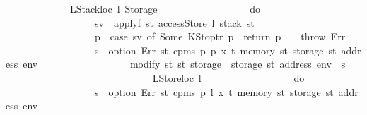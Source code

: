 \begin{isabellebody}
\ \ \ \ \ \ \ \ \ \ \ \ {\isacharbar}{\kern0pt}\ {\isacharparenleft}{\kern0pt}LStackloc\ l{\isacharcomma}{\kern0pt}\ Storage\ {\isacharunderscore}{\kern0pt}{\isacharparenright}{\kern0pt}\ {\isasymRightarrow}\isanewline
\ \ \ \ \ \ \ \ \ \ \ \ \ \ \ \ do\ {\isacharbraceleft}{\kern0pt}\isanewline
\ \ \ \ \ \ \ \ \ \ \ \ \ \ \ \ \ \ sv\ {\isasymleftarrow}\ applyf\ {\isacharparenleft}{\kern0pt}{\isasymlambda}st{\isachardot}{\kern0pt}\ accessStore\ l\ {\isacharparenleft}{\kern0pt}stack\ st{\isacharparenright}{\kern0pt}{\isacharparenright}{\kern0pt}{\isacharsemicolon}{\kern0pt}\isanewline
\ \ \ \ \ \ \ \ \ \ \ \ \ \ \ \ \ \ p{\isacharprime}{\kern0pt}\ {\isasymleftarrow}\ case\ sv\ of\ Some\ {\isacharparenleft}{\kern0pt}KStoptr\ p{\isacharprime}{\kern0pt}{\isacharparenright}{\kern0pt}\ {\isasymRightarrow}\ return\ p{\isacharprime}{\kern0pt}\ {\isacharbar}{\kern0pt}\ {\isacharunderscore}{\kern0pt}\ {\isasymRightarrow}\ throw\ Err{\isacharsemicolon}{\kern0pt}\isanewline
\ \ \ \ \ \ \ \ \ \ \ \ \ \ \ \ \ \ s\ {\isasymleftarrow}\ option\ Err\ {\isacharparenleft}{\kern0pt}{\isasymlambda}st{\isachardot}{\kern0pt}\ cpm{}s\ p\ p{\isacharprime}{\kern0pt}\ x\ t\ {\isacharparenleft}{\kern0pt}memory\ st{\isacharparenright}{\kern0pt}\ {\isacharparenleft}{\kern0pt}storage\ st\ {\isacharparenleft}{\kern0pt}address\ env{\isacharparenright}{\kern0pt}{\isacharparenright}{\kern0pt}{\isacharparenright}{\kern0pt}{\isacharsemicolon}{\kern0pt}\isanewline
\ \ \ \ \ \ \ \ \ \ \ \ \ \ \ \ \ \ modify\ {\isacharparenleft}{\kern0pt}{\isasymlambda}st{\isachardot}{\kern0pt}\ st\ {\isasymlparr}storage\ {\isacharcolon}{\kern0pt}{\isacharequal}{\kern0pt}\ {\isacharparenleft}{\kern0pt}storage\ st{\isacharparenright}{\kern0pt}\ {\isacharparenleft}{\kern0pt}address\ env\ {\isacharcolon}{\kern0pt}{\isacharequal}{\kern0pt}\ s{\isacharparenright}{\kern0pt}{\isasymrparr}{\isacharparenright}{\kern0pt}\isanewline
\ \ \ \ \ \ \ \ \ \ \ \ \ \ \ \ {\isacharbraceright}{\kern0pt}\isanewline
\ \ \ \ \ \ \ \ \ \ \ \ {\isacharbar}{\kern0pt}\ {\isacharparenleft}{\kern0pt}LStoreloc\ l{\isacharcomma}{\kern0pt}\ {\isacharunderscore}{\kern0pt}{\isacharparenright}{\kern0pt}\ {\isasymRightarrow}\isanewline
\ \ \ \ \ \ \ \ \ \ \ \ \ \ \ \ do\ {\isacharbraceleft}{\kern0pt}\isanewline
\ \ \ \ \ \ \ \ \ \ \ \ \ \ \ \ \ \ s\ {\isasymleftarrow}\ option\ Err\ {\isacharparenleft}{\kern0pt}{\isasymlambda}st{\isachardot}{\kern0pt}\ cpm{}s\ p\ l\ x\ t\ {\isacharparenleft}{\kern0pt}memory\ st{\isacharparenright}{\kern0pt}\ {\isacharparenleft}{\kern0pt}storage\ st\ {\isacharparenleft}{\kern0pt}address\ env{\isacharparenright}{\kern0pt}{\isacharparenright}{\kern0pt}{\isacharparenright}{\kern0pt}{\isacharsemicolon}{\kern0pt}\isanewline

\end{isabellebody}
